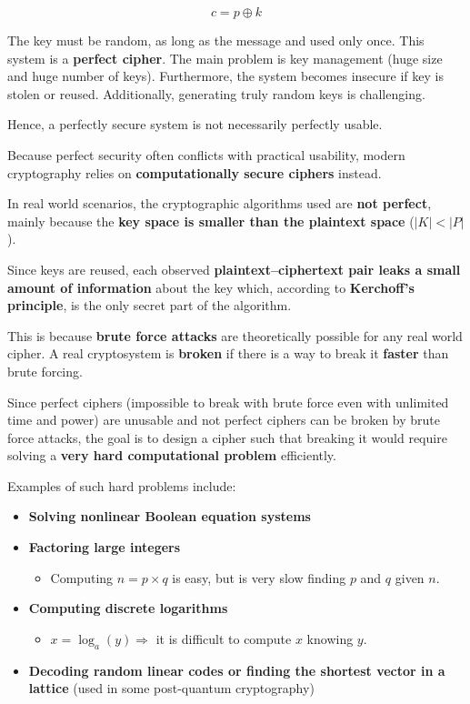 \documentclass{article}
\begin{document}
$$c = p \oplus k$$

The key must be random, as long as the message and used only once. This system is a \textbf{perfect cipher}. The main problem is key management (huge size and huge number of keys). Furthermore, the system becomes insecure if key is stolen or reused. Additionally, generating truly random keys is challenging.

Hence, a perfectly secure system is not necessarily perfectly usable.

Because perfect security often conflicts with practical usability, modern cryptography relies on \textbf{computationally secure ciphers} instead.

In real world scenarios, the cryptographic algorithms used are \textbf{not perfect}, mainly because the \textbf{key space is smaller than the plaintext space} ($| K | < | P |$).

Since keys are reused, each observed \textbf{plaintext--ciphertext pair leaks a small amount of information} about the key which, according to \textbf{Kerchoff's principle}, is the only secret part of the algorithm.

This is because \textbf{brute force attacks} are theoretically possible for any real world cipher. A real cryptosystem is \textbf{broken} if there is a way to break it \textbf{faster} than brute forcing.

Since perfect ciphers (impossible to break with brute force even with unlimited time and power) are unusable and not perfect ciphers can be broken by brute force attacks, the goal is to design a cipher such that breaking it would require solving a \textbf{very hard computational problem} efficiently.

Examples of such hard problems include:

\begin{itemize}
    \item \textbf{Solving nonlinear Boolean equation systems}
    \item \textbf{Factoring large integers}
    \begin{itemize}
        \item Computing $n = p \times q$ is easy, but is very slow finding $p$ and $q$ given $n$.
    \end{itemize}
    \item \textbf{Computing discrete logarithms}
    \begin{itemize}
        \item $x = \log_a(y) \Rightarrow$ it is difficult to compute $x$ knowing $y$.
    \end{itemize}
    \item \textbf{Decoding random linear codes or finding the shortest vector in a lattice} (used in some post-quantum cryptography)
\end{itemize}
\end{document}
